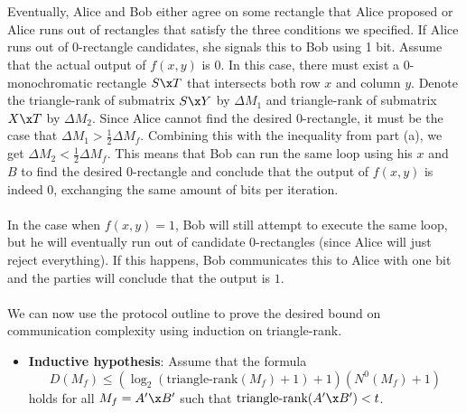 \documentclass{article}
\newcommand\tr{\textrm{triangle-rank}}
\begin{document}
\begin{enumerate}
\begin{enumerate}
            \\\\
            Eventually, Alice and Bob either agree on some rectangle that Alice
            proposed or Alice runs out of rectangles that satisfy the three
            conditions we specified. If Alice runs out of 0-rectangle
            candidates, she signals this to Bob using 1 bit. Assume that the
            actual output of $f(x,y)$ is $0$. In this case, there must exist a
            0-monochromatic rectangle $S \x T$ that intersects both row $x$ and
            column $y$. Denote the triangle-rank of submatrix $S \x Y$ by
            $\Delta M_1$ and triangle-rank of submatrix $X \x T$ by $\Delta
            M_2$. Since Alice cannot find the desired 0-rectangle, it must be
            the case that $\Delta M_1 > \frac{1}{2} \Delta M_f$. Combining this
            with the inequality from part (a), we get $\Delta M_2 < \frac{1}{2}
            \Delta M_f$. This means that Bob can run the same loop using his
            $x$ and $B$ to find the desired 0-rectangle and conclude that the
            output of $f(x, y)$ is indeed $0$, exchanging the same amount of
            bits per iteration.
            \\\\
            In the case when $f(x, y) = 1$, Bob will still attempt to execute
            the same loop, but he will eventually run out of candidate
            0-rectangles (since Alice will just reject everything). If this
            happens, Bob communicates this to Alice with one bit and the
            parties will conclude that the output is $1$.
            \\\\
            We can now use the protocol outline to prove the desired bound on
            communication complexity using induction on triangle-rank.
            \begin{itemize}
                \item \textbf{Inductive hypothesis}: Assume that the formula
                    $$D(M_f) \leq (\log_2(\tr(M_f) + 1) + 1)
                    (N^0(M_f) + 1)$$ holds for all $M_f = A' \x B'$ such that 
                    $\tr(A' \x B') < t$.


\end{itemize}
\end{enumerate}
\end{enumerate}
\end{document}
